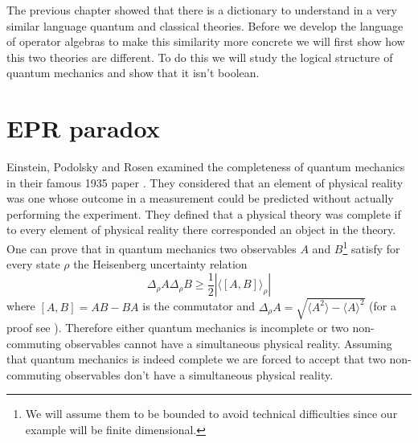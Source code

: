 The previous chapter showed that there is a dictionary to understand in a very similar language quantum and classical theories. Before we develop the language of operator algebras to make this similarity more concrete we will first show how this two theories are different. To do this we will study the logical structure of quantum mechanics and show that it isn't boolean.

\section{EPR paradox}

Einstein, Podolsky and Rosen examined the completeness of quantum mechanics in their famous 1935 paper \cite{Einstein1935}. They considered that an element of physical reality was one whose outcome in a measurement could be predicted without actually performing the experiment. They defined that a physical theory was complete if to every element of physical reality there corresponded an object in the theory. One can prove that in quantum mechanics two observables $A$ and $B$\footnote{We will assume them to be bounded to avoid technical difficulties since our example will be finite dimensional.} satisfy for every state $\rho$ the Heisenberg uncertainty relation
\begin{equation}
\Delta_\rho A\Delta_\rho B\geq\frac{1}{2}|\langle\left[A,B\right]\rangle_\rho|
\end{equation}
where $\left[A,B\right]=AB-BA$ is the commutator and $\Delta_\rho A=\sqrt{\langle A^2\rangle-\langle A\rangle^2}$ (for a proof see \cite{Strocchi2008a}). Therefore either quantum mechanics is incomplete or two non-commuting observables cannot have a simultaneous physical reality. Assuming that quantum mechanics is indeed complete we are forced to accept that two non-commuting observables don't have a simultaneous physical reality.

